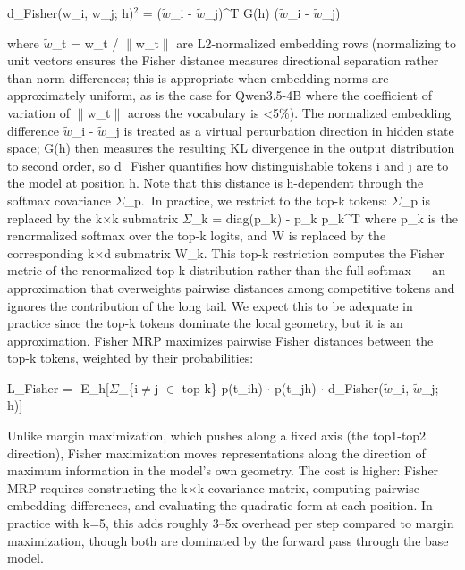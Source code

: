 \documentclass[
  11pt,
]{article}
\begin{document}
d\_Fisher(w\_i, w\_j; h)$^2$ = ($\tilde{w}$\_i - $\tilde{w}$\_j)\^{}T G(h) ($\tilde{w}$\_i - $\tilde{w}$\_j)

where $\tilde{w}$\_t = w\_t / $\|$w\_t$\|$ are L2-normalized embedding rows (normalizing
to unit vectors ensures the Fisher distance measures directional
separation rather than norm differences; this is appropriate when
embedding norms are approximately uniform, as is the case for Qwen3.5-4B
where the coefficient of variation of $\|$w\_t$\|$ across the vocabulary is
\textless5\%). The normalized embedding difference $\tilde{w}$\_i - $\tilde{w}$\_j is
treated as a virtual perturbation direction in hidden state space; G(h)
then measures the resulting KL divergence in the output distribution to
second order, so d\_Fisher quantifies how distinguishable tokens i and j
are to the model at position h. Note that this distance is h-dependent
through the softmax covariance $\Sigma$\_p.~In practice, we restrict to the
top-k tokens: $\Sigma$\_p is replaced by the k$\times$k submatrix $\Sigma$\_k = diag(p\_k) -
p\_k p\_k\^{}T where p\_k is the renormalized softmax over the top-k
logits, and W is replaced by the corresponding k$\times$d submatrix W\_k. This
top-k restriction computes the Fisher metric of the renormalized top-k
distribution rather than the full softmax --- an approximation that
overweights pairwise distances among competitive tokens and ignores the
contribution of the long tail. We expect this to be adequate in practice
since the top-k tokens dominate the local geometry, but it is an
approximation. Fisher MRP maximizes pairwise Fisher distances between
the top-k tokens, weighted by their probabilities:

L\_Fisher = -E\_h{[}$\Sigma$\_\{i$\neq$j $\in$ top-k\} p(t\_i\textbar h) $\cdot$
p(t\_j\textbar h) $\cdot$ d\_Fisher($\tilde{w}$\_i, $\tilde{w}$\_j; h){]}

Unlike margin maximization, which pushes along a fixed axis (the
top1-top2 direction), Fisher maximization moves representations along
the direction of maximum information in the model's own geometry. The
cost is higher: Fisher MRP requires constructing the k$\times$k covariance
matrix, computing pairwise embedding differences, and evaluating the
quadratic form at each position. In practice with k=5, this adds roughly
3--5x overhead per step compared to margin maximization, though both are
dominated by the forward pass through the base model.
\end{document}
